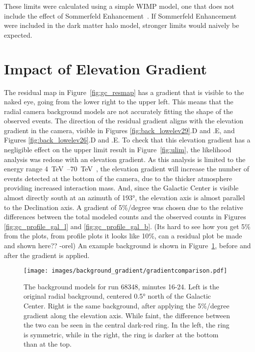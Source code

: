   These limits were calculated using a simple WIMP model, one that does not include the effect of Sommerfeld Enhancement~\cite{sommerfeld}.
  If Sommerfeld Enhancement were included in the dark matter halo model, stronger limits would naively be expected.
  
\FloatBarrier

\section{Impact of Elevation Gradient}\label{sec:elevgradient}

  The residual map in Figure~\ref{fig:gc_resmap} has a gradient that is visible to the naked eye, going from the lower right to the upper left.
  This means that the radial camera background models are not accurately fitting the shape of the observed events.
  The direction of the residual gradient aligns with the elevation gradient in the camera, visible in Figures \ref{fig:back_lowelev29}.D and .E, and Figures \ref{fig:back_lowelev26}.D and .E.
  To check that this elevation gradient has a negligible effect on the upper limit result in Figure~\ref{fig:ulim}, the likelihood analysis was redone with an elevation gradient.
  As this analysis is limited to the energy range \SIrange{4}{70}{\TeV{}}, the elevation gradient will increase the number of events detected at the bottom of the camera, due to the thicker atmosphere providing increased interaction mass.
  And, since the Galactic Center is visible almost directly south at an azimuth of \ang{193}, the elevation axis is almost parallel to the Declination axis.
  A gradient of 5\%/degree was chosen due to the relative differences between the total modeled counts and the observed counts in Figures \ref{fig:gc_profile_gal_l} and \ref{fig:gc_profile_gal_b}.
  {\color{red}(Its hard to see how you get 5\% from the plots, from profile plots it looks like 10\%, can a residual plot be made and shown here?? -orel)}
  An example background is shown in Figure~\ref{fig:bkg_flatvsgrad}, before and after the gradient is applied.
  
  \begin{figure}[ht]
    \centering
    \texttt{[image: images/background\_gradient/gradientcomparison.pdf]}
    \caption[Background Gradient Comparison]{
      The background models for run 68348, minutes 16-24.
      Left is the original radial background, centered \ang{0.5} north of the Galactic Center.
      Right is the same background, after applying the 5\%/degree gradient along the elevation axis.
      While faint, the difference between the two can be seen in the central dark-red ring.
      In the left, the ring is symmetric, while in the right, the ring is darker at the bottom than at the top.
    }
    \label{fig:bkg_flatvsgrad}
  \end{figure}
  
